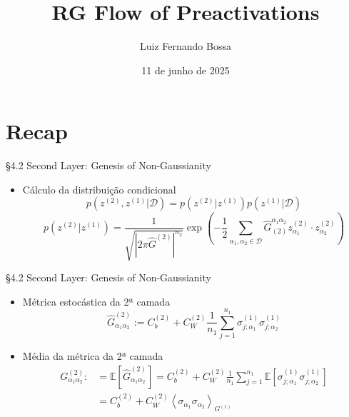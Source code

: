 \documentclass{beamer}
\title{RG Flow of Preactivations}
\author{Luiz Fernando Bossa}
\date{11 de junho de 2025}
\institute{Universidade Federal de Santa Catarina}
\newcommand{\EE}{\mathbb{E}}
\newcommand{\Dcal}{\mathcal{D}}
\def\mi#1{{\alpha_{#1}}}
\def\Gchapp#1{\widehat{G}^{(#1)}}
\newcommand{\Gchapeu}[3]{{\Gchapp{#1}_{\mi{#2}\mi{#3}}}}
\newcommand{\Gchapeuinv}[3]{\widehat{G}_{(#1)}^{\mi{#2}\mi{#3}}}
\newcommand{\Gnormal}[3]{{G^{(#1)}_{\mi{#2}\mi{#3}}}}
\newcommand{\Expectation}[2]{\left\langle #1 \right\rangle_{#2}}
\begin{document}
{ 
\frame{\titlepage}}
\frame{\tableofcontents}


\section{Recap}    
\begin{frame}
\tableofcontents[currentsection]
\end{frame}


\begin{frame}{\S 4.2 Second Layer: Genesis of Non-Gaussianity}
	\begin{itemize}
		\item Cálculo da distribuição condicional
		\begin{equation*}\tag{4.32}
			p\left(z^{(2)},z^{(1)}\Big|\Dcal\right) = p\left(z^{(2)}\Big| z^{(1)}\right)p\left(z^{(1)}\Big| \Dcal\right)
		\end{equation*}
		\begin{equation*}\tag{4.35}
			p\left(z^{(2)}\Big| z^{(1)}\right) = \frac{1}{\sqrt{\left|2\pi \hat{G}^{(2)}\right|^{n_2}}}
			\exp\left(-\frac{1}{2} \sum_{\mi1,\mi2\in\Dcal} \Gchapeuinv212 z^{(2)}_{\mi1}\cdot z^{(2)}_{\mi2} \right)
		\end{equation*}
	\end{itemize}
\end{frame}

\begin{frame}{\S 4.2 Second Layer: Genesis of Non-Gaussianity}

\begin{itemize}
	\item 
	Métrica estocástica da 2ª camada
	\begin{equation*}\tag{4.36}
		\Gchapeu212 := C_b^{(2)} + C_W^{(2)}\frac{1}{n_1}\sum_{j=1}^{n_1} \sigma_{j;\mi1}^{(1)}\sigma_{j;\mi2}^{(1)}
	\end{equation*}

	\item Média da métrica da 2ª camada
	\begin{align*}
		\Gnormal212 :&= \EE\left[\Gchapeu212\right] 
		= C_b^{(2)} + C_W^{(2)}\frac{1}{n_1}\sum_{j=1}^{n_1} \EE\left[\sigma_{j;\mi1}^{(1)}\sigma_{j;\mi2}^{(1)}\right]\\
		&= C_b^{(2)} + C_W^{(2)}\Expectation{\sigma_{\mi1}\sigma_{\mi2}}{G^{(1)}}\tag{4.37}
	\end{align*}
\end{itemize}

\end{frame}
\end{document}
